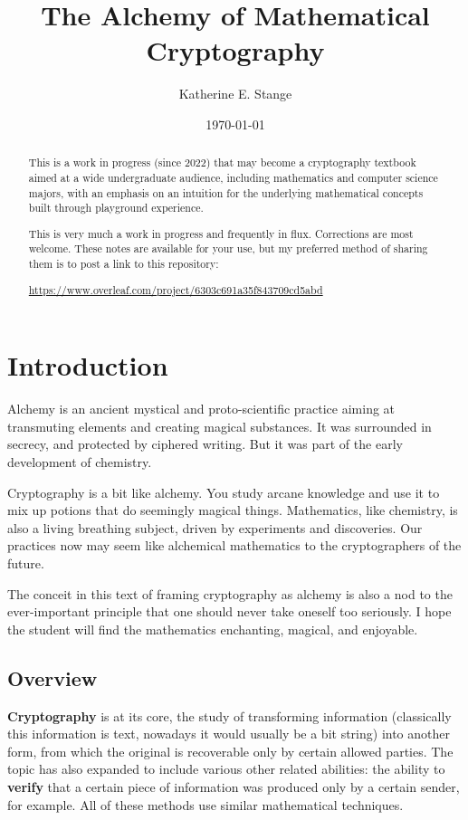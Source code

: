 \documentclass{article}
\title{The Alchemy of Mathematical Cryptography}
\author{Katherine E. Stange}
\date{\today}%
\theoremstyle{plain}
\theoremstyle{definition}
\theoremstyle{remark}
\numberwithin{theorem}{section}
\begin{document}
\maketitle

\begin{abstract}
This is a work in progress (since 2022) that may become a cryptography textbook aimed at a wide undergraduate audience, including mathematics and computer science majors, with an emphasis on an intuition for the underlying mathematical concepts built through playground experience.  

This is very much a work in progress and frequently in flux.  Corrections are most welcome.  These notes are available for your use, but my preferred method of sharing them is to post a link to this repository:

\begin{center}
\url{https://www.overleaf.com/project/6303c691a35f843709cd5abd}
\end{center}
\end{abstract}

\tableofcontents


\section{Introduction}

Alchemy is an ancient mystical and proto-scientific practice aiming at transmuting elements and creating magical substances.  It was surrounded in secrecy, and protected by ciphered writing.  But it was part of the early development of chemistry.

Cryptography is a bit like alchemy.  You study arcane knowledge and use it to mix up potions that do seemingly magical things.  Mathematics, like chemistry, is also a living breathing subject, driven by experiments and discoveries.  Our practices now may seem like alchemical mathematics to the cryptographers of the future.  

The conceit in this text of framing cryptography as alchemy is also a nod to the ever-important principle that one should never take oneself too seriously.  I hope the student will find the mathematics enchanting, magical, and enjoyable.


\subsection{Overview}

\textbf{Cryptography} is at its core, the study of transforming information (classically this information is text, nowadays it would usually be a bit string) into another form, from which the original is recoverable only by certain allowed parties.  The topic has also expanded to include various other related abilities:  the ability to \textbf{verify} that a certain piece of information was produced only by a certain sender, for example.  All of these methods use similar mathematical techniques.
\end{document}
